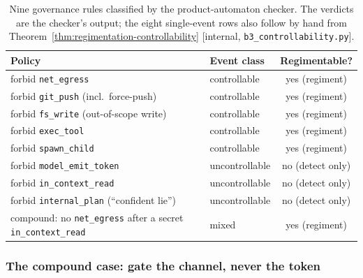 \documentclass[11pt,a4paper]{article}
\theoremstyle{definition}
\theoremstyle{remark}
\begin{document}
\begin{table}[H]
\centering
\caption{Nine governance rules classified by the product-automaton checker. The verdicts are
the checker's output; the eight single-event rows also follow by hand from
Theorem~\ref{thm:regimentation-controllability} [internal, \texttt{b3\_controllability.py}].}
\label{tab:policy-classification}
\small
\begin{tabularx}{\textwidth}{@{}>{\raggedright\arraybackslash}X lc@{}}
\toprule
\textbf{Policy} & \textbf{Event class} & \textbf{Regimentable?} \\
\midrule
forbid \texttt{net\_egress} & controllable & yes (regiment) \\
forbid \texttt{git\_push} (incl.\ force-push) & controllable & yes (regiment) \\
forbid \texttt{fs\_write} (out-of-scope write) & controllable & yes (regiment) \\
forbid \texttt{exec\_tool} & controllable & yes (regiment) \\
forbid \texttt{spawn\_child} & controllable & yes (regiment) \\
forbid \texttt{model\_emit\_token} & uncontrollable & no (detect only) \\
forbid \texttt{in\_context\_read} & uncontrollable & no (detect only) \\
forbid \texttt{internal\_plan} (``confident lie'') & uncontrollable & no (detect only) \\
\midrule
compound: no \texttt{net\_egress} after a secret \texttt{in\_context\_read} & mixed & yes (regiment) \\
\bottomrule
\end{tabularx}
\end{table}

\subsubsection{The compound case: gate the channel, never the token}
\label{sec:gate-the-channel}
\end{document}
